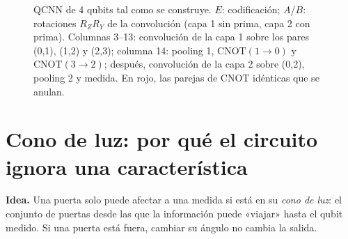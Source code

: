 \documentclass[11pt,a4paper]{article}
\begin{document}
\begin{figure}[H]
\centering
{}
\caption{QCNN de 4 qubits tal como se construye. $E$: codificación; $A$/$B$: rotaciones $R_Z R_Y$ de la convolución
(capa 1 sin prima, capa 2 con prima). Columnas 3--13: convolución de la capa 1 sobre los pares (0,1), (1,2) y (2,3);
columna 14: pooling 1, $\mathrm{CNOT}(1\to0)$ y $\mathrm{CNOT}(3\to2)$; después, convolución de la capa 2 sobre
(0,2), pooling 2 y medida. En rojo, las parejas de CNOT idénticas que se anulan.}
\end{figure}

\section{Cono de luz: por qué el circuito ignora una característica}\label{sec:cono}

\textbf{Idea.} Una puerta solo puede afectar a una medida si está en su \emph{cono de luz}: el conjunto de puertas
desde las que la información puede «viajar» hasta el qubit medido. Si una puerta está fuera, cambiar su ángulo no cambia
la salida.
\end{document}
